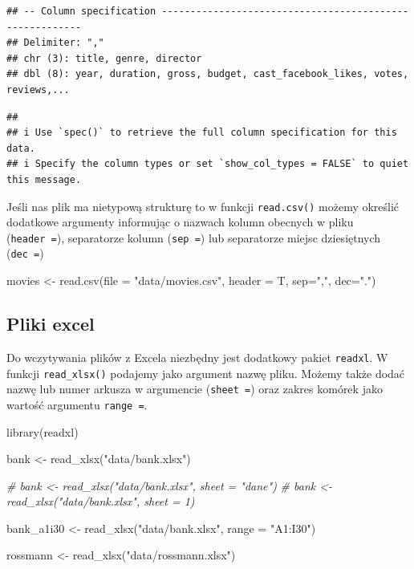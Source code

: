 \documentclass[
]{book}
\newenvironment{Shaded}{\begin{snugshade}}{\end{snugshade}}
\newcommand{\AttributeTok}[1]{\textcolor[rgb]{0.77,0.63,0.00}{#1}}
\newcommand{\CommentTok}[1]{\textcolor[rgb]{0.56,0.35,0.01}{\textit{#1}}}
\newcommand{\FunctionTok}[1]{\textcolor[rgb]{0.00,0.00,0.00}{#1}}
\newcommand{\NormalTok}[1]{#1}
\newcommand{\OtherTok}[1]{\textcolor[rgb]{0.56,0.35,0.01}{#1}}
\newcommand{\StringTok}[1]{\textcolor[rgb]{0.31,0.60,0.02}{#1}}
\begin{document}
\begin{verbatim}
## -- Column specification --------------------------------------------------------
## Delimiter: ","
## chr (3): title, genre, director
## dbl (8): year, duration, gross, budget, cast_facebook_likes, votes, reviews,...
\end{verbatim}

\begin{verbatim}
## 
## i Use `spec()` to retrieve the full column specification for this data.
## i Specify the column types or set `show_col_types = FALSE` to quiet this message.
\end{verbatim}

Jeśli nas plik ma nietypową strukturę to w funkcji \texttt{read.csv()} możemy określić dodatkowe argumenty informując o nazwach kolumn obecnych w pliku (\texttt{header\ =}), separatorze kolumn (\texttt{sep\ =}) lub separatorze miejsc dziesiętnych (\texttt{dec\ =})

\begin{Shaded}
\begin{Highlighting}[]
\NormalTok{movies }\OtherTok{\textless{}{-}} \FunctionTok{read.csv}\NormalTok{(}\AttributeTok{file =} \StringTok{"data/movies.csv"}\NormalTok{, }\AttributeTok{header =}\NormalTok{ T, }\AttributeTok{sep=}\StringTok{","}\NormalTok{, }\AttributeTok{dec=}\StringTok{"."}\NormalTok{)}
\end{Highlighting}
\end{Shaded}

\hypertarget{pliki-excel}{%
\subsection{Pliki excel}\label{pliki-excel}}

Do wczytywania plików z Excela niezbędny jest dodatkowy pakiet \texttt{readxl}. W funkcji \texttt{read\_xlsx()} podajemy jako argument nazwę pliku. Możemy także dodać nazwę lub numer arkusza w argumencie (\texttt{sheet\ =}) oraz zakres komórek jako wartość argumentu \texttt{range\ =}.

\begin{Shaded}
\begin{Highlighting}[]
\FunctionTok{library}\NormalTok{(readxl)}

\NormalTok{bank }\OtherTok{\textless{}{-}} \FunctionTok{read\_xlsx}\NormalTok{(}\StringTok{"data/bank.xlsx"}\NormalTok{)}

\CommentTok{\# bank \textless{}{-} read\_xlsx("data/bank.xlsx", sheet = "dane")}
\CommentTok{\# bank \textless{}{-} read\_xlsx("data/bank.xlsx", sheet = 1)}

\NormalTok{bank\_a1i30 }\OtherTok{\textless{}{-}} \FunctionTok{read\_xlsx}\NormalTok{(}\StringTok{"data/bank.xlsx"}\NormalTok{, }\AttributeTok{range =} \StringTok{"A1:I30"}\NormalTok{)}

\NormalTok{rossmann }\OtherTok{\textless{}{-}} \FunctionTok{read\_xlsx}\NormalTok{(}\StringTok{"data/rossmann.xlsx"}\NormalTok{)}
\end{Highlighting}
\end{Shaded}
\end{document}
